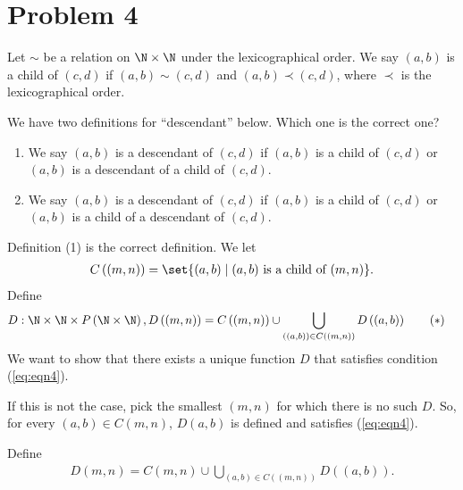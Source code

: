 \documentclass[10pt]{mypackage}
\begin{document}
\section{Problem 4}%
\begin{problem}
  Let $\sim$ be a relation on $\N\times \N$ under the lexicographical order. We say $(a,b)$ is a child of $(c,d)$ if $(a,b)\sim (c,d)$ and $(a,b) \prec (c,d)$, where $\prec$ is the lexicographical order.\newline

  We have two definitions for ``descendant'' below. Which one is the correct one?
  \begin{enumerate}[(1)]
    \item We say $(a,b)$ is a descendant of $(c,d)$ if $(a,b)$ is a child of $(c,d)$ or $(a,b)$ is a descendant of a child of $(c,d)$.
    \item We say $(a,b)$ is a descendant of $(c,d)$ if $(a,b)$ is a child of $(c,d)$ or $(a,b)$ is a child of a descendant of $(c,d)$.
  \end{enumerate}
\end{problem}
\begin{solution}
  Definition (1) is the correct definition. We let
  \begin{align*}
    C\left((m,n)\right) = \set{(a,b)\mid (a,b)\text{ is a child of }(m,n)}.
  \end{align*}
  Define
  \begin{align*}
    D: \N\times \N\times P\left(\N\times \N\right),
    D\left(\left(m,n\right)\right) &= C\left((m,n)\right) \cup \bigcup_{\left((a,b)\right)\in C\left(\left(m,n\right)\right)} D\left(\left(a,b\right)\right)\label{eq:eqn4}\tag{\textasteriskcentered}
  \end{align*}
  We want to show that there exists a unique function $D$ that satisfies condition (\ref{eq:eqn4}).\newline

  If this is not the case, pick the smallest $(m,n)$ for which there is no such $D$. So, for every $(a,b)\in C(m,n)$, $D(a,b)$ is defined and satisfies (\ref{eq:eqn4}).\newline

  Define 
  \begin{align*}
    D(m,n) = C\left(m,n\right)\cup \bigcup_{\left(a,b\right)\in C\left(\left(m,n\right)\right)} D\left((a,b)\right).
  \end{align*}
\end{solution}
\end{document}

